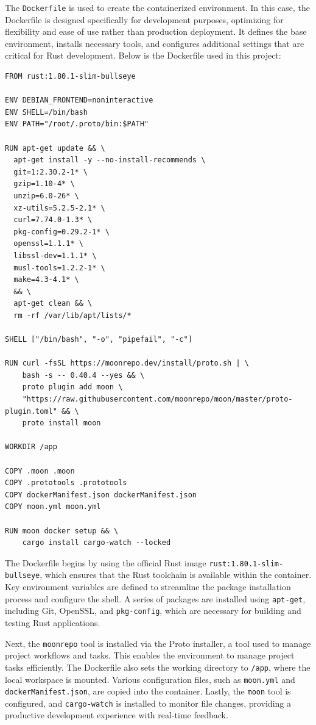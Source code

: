 The \texttt{Dockerfile} is used to create the containerized environment. In this
case, the Dockerfile is designed specifically for development purposes, optimizing
for flexibility and ease of use rather than production deployment. It defines the
base environment, installs necessary tools, and configures additional settings that
are critical for Rust development. Below is the Dockerfile used in this project:

\begin{lstlisting}[caption={Development Dockerfile for Rust Project}]
FROM rust:1.80.1-slim-bullseye

ENV DEBIAN_FRONTEND=noninteractive
ENV SHELL=/bin/bash
ENV PATH="/root/.proto/bin:$PATH"

RUN apt-get update && \
  apt-get install -y --no-install-recommends \
  git=1:2.30.2-1* \
  gzip=1.10-4* \
  unzip=6.0-26* \
  xz-utils=5.2.5-2.1* \
  curl=7.74.0-1.3* \
  pkg-config=0.29.2-1* \
  openssl=1.1.1* \
  libssl-dev=1.1.1* \
  musl-tools=1.2.2-1* \
  make=4.3-4.1* \
  && \
  apt-get clean && \
  rm -rf /var/lib/apt/lists/*

SHELL ["/bin/bash", "-o", "pipefail", "-c"]

RUN curl -fsSL https://moonrepo.dev/install/proto.sh | \
    bash -s -- 0.40.4 --yes && \
    proto plugin add moon \
    "https://raw.githubusercontent.com/moonrepo/moon/master/proto-plugin.toml" && \
    proto install moon

WORKDIR /app

COPY .moon .moon
COPY .prototools .prototools
COPY dockerManifest.json dockerManifest.json
COPY moon.yml moon.yml

RUN moon docker setup && \
    cargo install cargo-watch --locked
\end{lstlisting}

The Dockerfile begins by using the official Rust image \texttt{rust:1.80.1-slim-bullseye},
which ensures that the Rust toolchain is available within the container. Key environment
variables are defined to streamline the package installation process and configure the
shell. A series of packages are installed using \texttt{apt-get}, including Git, OpenSSL,
and \texttt{pkg-config}, which are necessary for building and testing Rust applications.

Next, the \texttt{moonrepo} tool is installed via the Proto installer, a tool used to
manage project workflows and tasks. This enables the environment to manage project tasks
efficiently. The Dockerfile also sets the working directory to \texttt{/app}, where the
local workspace is mounted. Various configuration files, such as \texttt{moon.yml} and
\texttt{dockerManifest.json}, are copied into the container. Lastly, the \texttt{moon}
tool is configured, and \texttt{cargo-watch} is installed to monitor file changes,
providing a productive development experience with real-time feedback.

